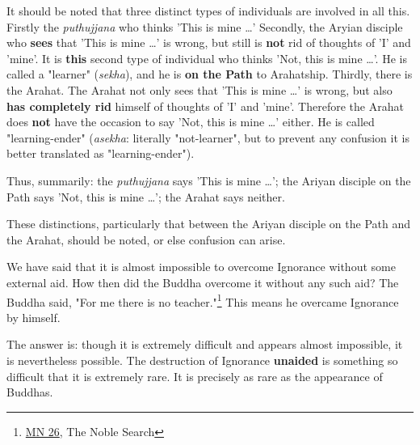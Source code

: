 It should be noted that three distinct types of individuals are involved
in all this. Firstly the \emph{puthujjana} who thinks 'This is mine …​'
Secondly, the Aryian disciple who \textbf{sees} that 'This is mine …​' is
wrong, but still is \textbf{not} rid of thoughts of 'I' and 'mine'. It is
\textbf{this} second type of individual who thinks 'Not, this is mine …​'. He
is called a "learner" (\emph{sekha}), and he is \textbf{on the Path} to
Arahatship. Thirdly, there is the Arahat. The Arahat not only sees that
'This is mine …​' is wrong, but also \textbf{has completely rid} himself of
thoughts of 'I' and 'mine'. Therefore the Arahat does \textbf{not} have the
occasion to say 'Not, this is mine …​' either. He is called
"learning-ender" (\emph{asekha}: literally "not-learner", but to prevent
any confusion it is better translated as "learning-ender").


Thus, summarily: the \emph{puthujjana} says 'This is mine …​'; the Ariyan
disciple on the Path says 'Not, this is mine …​'; the Arahat says
neither.


These distinctions, particularly that between the Ariyan disciple on the
Path and the Arahat, should be noted, or else confusion can arise.


We have said that it is almost impossible to overcome Ignorance without
some external aid. How then did the Buddha overcome it without any such
aid? The Buddha said, "For me there is no teacher."\footnote{\href{https://suttacentral.net/mn26/en/bodhi}{MN 26}, The Noble Search}
This means he overcame Ignorance by himself.


The answer is: though it is extremely difficult and appears almost
impossible, it is nevertheless possible. The destruction of Ignorance
\textbf{unaided} is something so difficult that it is extremely rare. It is
precisely as rare as the appearance of Buddhas.


